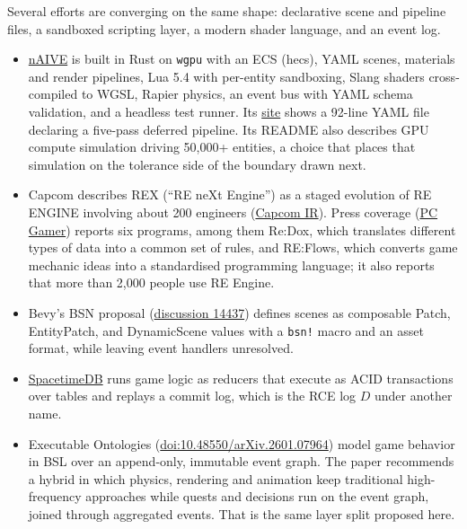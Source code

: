 \documentclass[10pt,letterpaper]{article}
\providecommand{\tightlist}{\setlength{\itemsep}{1pt}\setlength{\parskip}{0pt}}
\begin{document}
Several efforts are converging on the same shape: declarative scene and
pipeline files, a sandboxed scripting layer, a modern shader language,
and an event log.

\begin{itemize}
\tightlist
\item
  \href{https://github.com/poro/nAIVE}{nAIVE} is built in Rust on
  \texttt{wgpu} with an ECS (hecs), YAML scenes, materials and render
  pipelines, Lua 5.4 with per-entity sandboxing, Slang shaders
  cross-compiled to WGSL, Rapier physics, an event bus with YAML schema
  validation, and a headless test runner. Its
  \href{https://naive.dev/}{site} shows a 92-line YAML file declaring a
  five-pass deferred pipeline. Its README also describes GPU compute
  simulation driving 50,000+ entities, a choice that places that
  simulation on the tolerance side of the boundary drawn next.
\item
  Capcom describes REX (``RE neXt Engine'') as a staged evolution of RE
  ENGINE involving about 200 engineers
  (\href{https://www.capcom.co.jp/ir/english/data/oar/2025/re-engine.html}{Capcom
  IR}). Press coverage
  (\href{https://www.pcgamer.com/gaming-industry/game-development/capcom-announces-plans-to-transform-its-re-engine-into-an-ai-generation-game-engine/}{PC
  Gamer}) reports six programs, among them Re:Dox, which translates
  different types of data into a common set of rules, and RE:Flows,
  which converts game mechanic ideas into a standardised programming
  language; it also reports that more than 2,000 people use RE Engine.
\item
  Bevy's BSN proposal
  (\href{https://github.com/bevyengine/bevy/discussions/14437}{discussion
  14437}) defines scenes as composable Patch, EntityPatch, and
  DynamicScene values with a \texttt{bsn!} macro and an asset format,
  while leaving event handlers unresolved.
\item
  \href{https://github.com/clockworklabs/SpacetimeDB}{SpacetimeDB} runs
  game logic as reducers that execute as ACID transactions over tables
  and replays a commit log, which is the RCE log \(D\) under another
  name.
\item
  Executable Ontologies
  (\href{https://doi.org/10.48550/arXiv.2601.07964}{doi:10.48550/arXiv.2601.07964})
  model game behavior in BSL over an append-only, immutable event graph.
  The paper recommends a hybrid in which physics, rendering and
  animation keep traditional high-frequency approaches while quests and
  decisions run on the event graph, joined through aggregated events.
  That is the same layer split proposed here.
\end{itemize}
\end{document}

